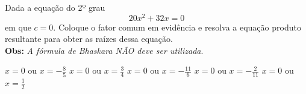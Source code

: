 Dada a equação do 2º grau
\[20x^2+32x=0\]
em que $c=0$. Coloque o fator comum em evidência e resolva a equação produto resultante para obter as raízes dessa equação.\\{\bf Obs: }{\it A fórmula de Bhaskara NÃO deve ser utilizada}.

$x=0$ ou $x=-\frac{8}{5}$
$x=0$ ou $x= \frac{3}{4}$
$x=0$ ou $x=-\frac{11}{6}$
$x=0$ ou $x=-\frac{2}{11}$
$x=0$ ou $x= \frac{1}{2}$



